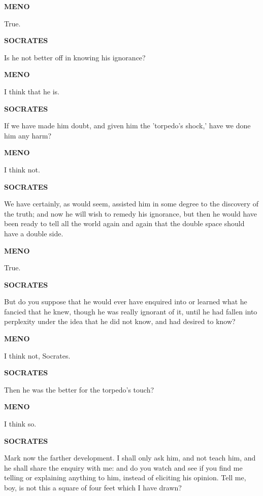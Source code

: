 \documentclass[11pt,letter]{article}
\begin{document}
\par \textbf{MENO}
\par   True.

\par \textbf{SOCRATES}
\par   Is he not better off in knowing his ignorance?

\par \textbf{MENO}
\par   I think that he is.

\par \textbf{SOCRATES}
\par   If we have made him doubt, and given him the 'torpedo's shock,' have we done him any harm?

\par \textbf{MENO}
\par   I think not.

\par \textbf{SOCRATES}
\par   We have certainly, as would seem, assisted him in some degree to the discovery of the truth; and now he will wish to remedy his ignorance, but then he would have been ready to tell all the world again and again that the double space should have a double side.

\par \textbf{MENO}
\par   True.

\par \textbf{SOCRATES}
\par   But do you suppose that he would ever have enquired into or learned what he fancied that he knew, though he was really ignorant of it, until he had fallen into perplexity under the idea that he did not know, and had desired to know?

\par \textbf{MENO}
\par   I think not, Socrates.

\par \textbf{SOCRATES}
\par   Then he was the better for the torpedo's touch?

\par \textbf{MENO}
\par   I think so.

\par \textbf{SOCRATES}
\par   Mark now the farther development. I shall only ask him, and not teach him, and he shall share the enquiry with me:  and do you watch and see if you find me telling or explaining anything to him, instead of eliciting his opinion. Tell me, boy, is not this a square of four feet which I have drawn?
\end{document}
